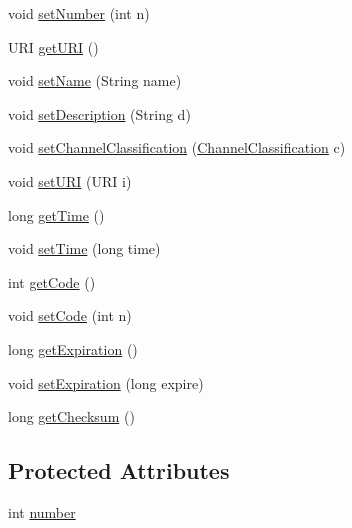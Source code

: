 \begin{DoxyCompactItemize}
\item 
void \hyperlink{classgov_1_1fnal_1_1ppd_1_1dd_1_1channel_1_1ChannelImpl_af4d05e867b9f3f62c56b5d06f69889f7}{set\-Number} (int n)
\item 
U\-R\-I \hyperlink{classgov_1_1fnal_1_1ppd_1_1dd_1_1channel_1_1ChannelImpl_a9004e74f2476cb8f7a4d56285d49ba45}{get\-U\-R\-I} ()
\item 
void \hyperlink{classgov_1_1fnal_1_1ppd_1_1dd_1_1channel_1_1ChannelImpl_a0d227de9590cc6ce476497c8f919f2e4}{set\-Name} (String name)
\item 
void \hyperlink{classgov_1_1fnal_1_1ppd_1_1dd_1_1channel_1_1ChannelImpl_abb1380a6a0403aa8b3603d39cdc38ea4}{set\-Description} (String d)
\item 
void \hyperlink{classgov_1_1fnal_1_1ppd_1_1dd_1_1channel_1_1ChannelImpl_a4e64970f8cfaf5c9fabe173feb40a0d4}{set\-Channel\-Classification} (\hyperlink{classgov_1_1fnal_1_1ppd_1_1dd_1_1changer_1_1ChannelClassification}{Channel\-Classification} c)
\item 
void \hyperlink{classgov_1_1fnal_1_1ppd_1_1dd_1_1channel_1_1ChannelImpl_a685f3caf0f4e3d501e68c55794f38111}{set\-U\-R\-I} (U\-R\-I i)
\item 
long \hyperlink{classgov_1_1fnal_1_1ppd_1_1dd_1_1channel_1_1ChannelImpl_aa2d5c561810b90f2401e5da2c1972774}{get\-Time} ()
\item 
void \hyperlink{classgov_1_1fnal_1_1ppd_1_1dd_1_1channel_1_1ChannelImpl_ae5c03927d8473ecae11b4002395da886}{set\-Time} (long time)
\item 
int \hyperlink{classgov_1_1fnal_1_1ppd_1_1dd_1_1channel_1_1ChannelImpl_ab7c659985471afada6dece70c1d75b61}{get\-Code} ()
\item 
void \hyperlink{classgov_1_1fnal_1_1ppd_1_1dd_1_1channel_1_1ChannelImpl_aa13af9f5763f97581ec533f91e380906}{set\-Code} (int n)
\item 
long \hyperlink{classgov_1_1fnal_1_1ppd_1_1dd_1_1channel_1_1ChannelImpl_af509fea6b9340b85522025b70cc4e64e}{get\-Expiration} ()
\item 
void \hyperlink{classgov_1_1fnal_1_1ppd_1_1dd_1_1channel_1_1ChannelImpl_a9428ab2c22c4272e97c2251eb38e8b2e}{set\-Expiration} (long expire)
\item 
long \hyperlink{classgov_1_1fnal_1_1ppd_1_1dd_1_1channel_1_1ChannelImpl_abfc920cea3e8ce7156aad3d9a87213c8}{get\-Checksum} ()
\end{DoxyCompactItemize}
\subsection*{Protected Attributes}
\begin{DoxyCompactItemize}
\item 
int \hyperlink{classgov_1_1fnal_1_1ppd_1_1dd_1_1channel_1_1ChannelImpl_ae4de39eb5e2f7c434f3b71f054ae9735}{number}
\end{DoxyCompactItemize}


